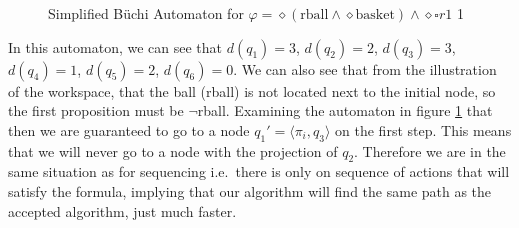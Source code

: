\begin{figure}
\centering
{}
\caption{Simplified B\"uchi Automaton for $\varphi = \diamond (\text{rball} \wedge \diamond \text{basket}) \wedge \diamond \square r1$ 1}
\label{fig:ex1SimplifiedBuchi}
\end{figure} 

In this automaton, we can see that $d(q_1)=3$, $d(q_2)=2$, $d(q_3)=3$, $d(q_4)=1$, $d(q_5)=2$, $d(q_6)=0$. We can also see that from the illustration of the workspace, that the ball (rball) is not located next to the initial node, so the first proposition must be $\neg$rball. Examining the automaton in figure \ref{fig:ex1SimplifiedBuchi} that then we are guaranteed to go to a node $q_1' = \langle \pi_i , q_3 \rangle$ on the first step. This means that we will never go to a node with the projection of $q_2$. Therefore we are in the same situation as for sequencing i.e.\ there is only on sequence of actions that will satisfy the formula, implying that our algorithm will find the same path as the accepted algorithm, just much faster. 

